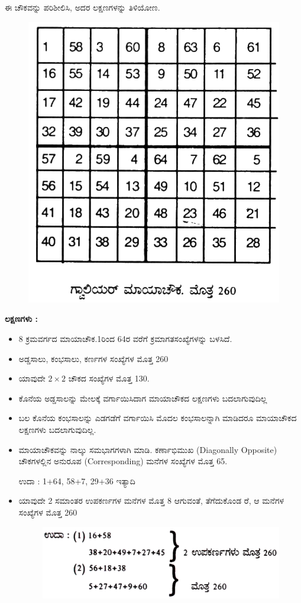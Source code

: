 ಈ ಚೌಕವನ್ನು ಪರಿಶೀಲಿಸಿ, ಅದರ ಲಕ್ಷಣಗಳನ್ನು ತಿಳಿಯೋಣ.
\begin{figure}[h]
\includegraphics{src/figures/chap4/fig4.21.jpg}
\end{figure}

\textbf{ಲಕ್ಷಣಗಳು :}

\begin{itemize}
	\item 8 ಕ್ರಮವರ್ಗದ ಮಾಯಾಚೌಕ.1ರಿಂದ 64ರ ವರೆಗೆ ಕ್ರಮಾಗತಸಂಖ್ಯೆಗಳನ್ನು ಬಳಸಿದೆ.
	\item ಅಡ್ಡಸಾಲು, ಕಂಭಸಾಲು, ಕರ್ಣಗಳ ಸಂಖ್ಯೆಗಳ ಮೊತ್ತ 260
	\item ಯಾವುದೇ $2 \times 2$ ಚೌಕದ ಸಂಖ್ಯೆಗಳ ಮೊತ್ತ 130.
	\item ಕೊನೆಯ ಅಡ್ಡಸಾಲನ್ನು ಮೇಲಕ್ಕೆ ವರ್ಗಾಯಿಸಿದಾಗ ಮಾಯಾಚೌಕದ ಲಕ್ಷಣಗಳು ಬದಲಾಗುವುದಿಲ್ಲ
	\item ಬಲ ಕೊನೆಯ ಕಂಭಸಾಲನ್ನು ಎಡಗಡೆಗೆ ವರ್ಗಾಯಿಸಿ ಮೊದಲ ಕಂಭಸಾಲನ್ನಾಗಿ ಮಾಡಿದರೂ ಮಾಯಾಚೌಕದ ಲಕ್ಷಣಗಳು ಬದಲಾಗುವುದಿಲ್ಲ.
	\item ಮಾಯಾಚೌಕವನ್ನು ನಾಲ್ಕು ಸಮಭಾಗಗಳಾಗಿ ಮಾಡಿ. ಕರ್ಣಾಭಿಮುಖ (Diagonally Opposite) ಚೌಕಗಳಲ್ಲಿನ ಅನುರೂಪ (Corresponding) ಮನೆಗಳ ಸಂಖ್ಯೆಗಳ ಮೊತ್ತ 65.

	ಉದಾ : 1+64, 58+7, 29+36 ಇತ್ಯಾದಿ
	\item ಯಾವುದೇ 2 ಸಮಾಂತರ ಉಪಕರ್ಣಗಳ ಮನೆಗಳ ಮೊತ್ತ 8 ಆಗುವಂತೆ, ತೆಗೆದುಕೊಂಡ ರೆ, ಆ ಮನೆಗಳ ಸಂಖ್ಯೆಗಳ ಮೊತ್ತ 260
	\begin{figure}[h]
	\includegraphics{src/figures/chap4/fig4.22.jpg}
	\end{figure}
\end{itemize}

